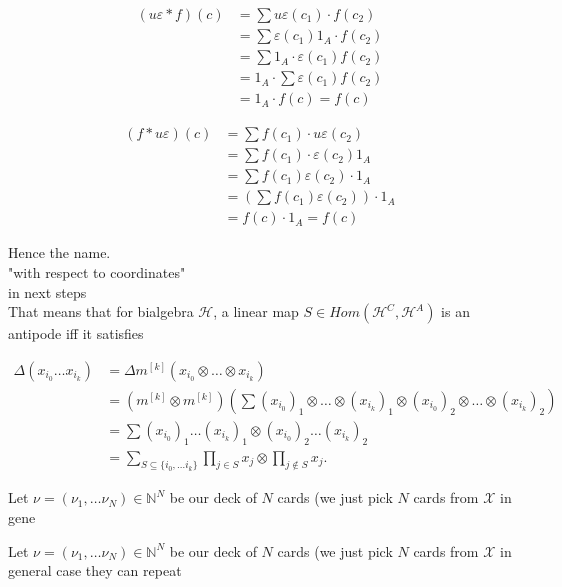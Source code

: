\documentclass[a4paper]{article}
\begin{document}
\begin{align*}
(u\varepsilon *f)(c) &= \sum u\varepsilon(c_1) \cdot f(c_2) \\
&= \sum \varepsilon(c_1)1_A \cdot f(c_2) \\
&= \sum 1_A \cdot \varepsilon(c_1)f(c_2) \\
&= 1_A \cdot \sum \varepsilon(c_1)f(c_2) \\
&= 1_A \cdot f(c) = f(c)
\end{align*}

\begin{align*}
(f * u\varepsilon)(c) &= \sum f(c_1) \cdot u\varepsilon(c_2) \\
&= \sum f(c_1) \cdot \varepsilon(c_2)1_A \\
&= \sum f(c_1)\varepsilon(c_2) \cdot 1_A \\
&= \left(\sum f(c_1)\varepsilon(c_2)\right)\cdot 1_A \\
&= f(c) \cdot 1_A = f(c)
\end{align*}


Hence the name. \\

"with respect to coordinates" \\

in next steps \\

That means that for bialgebra $\mathcal{H}$, a linear map $S \in Hom(\mathcal{H}^C, \mathcal{H}^A)$ 
is an antipode iff it satisfies

\begin{align*}
\Delta(x_{i_0}\dots x_{i_k}) &= \Delta m^{[k]}(x_{i_0} \otimes \dots \otimes x_{i_k}) \\ 
&= (m^{[k]} \otimes m^{[k]}) \left(\sum (x_{i_0})_1 \otimes \dots \otimes (x_{i_k})_1 \otimes 
(x_{i_0})_2 \otimes \dots \otimes (x_{i_k})_2\right) \\ 
&= \sum (x_{i_0})_1 \dots (x_{i_k})_1 \otimes 
(x_{i_0})_2 \dots (x_{i_k})_2 \\ 
&= \sum_{S \subseteq \{i_0, \dots i_k\}} \prod_{j \in S} x_j \otimes \prod_{j \notin S} x_j.
\end{align*}

Let $\nu = (\nu_1, \dots \nu_N) \in \mathbb{N}^N$ be our deck of $N$ cards (we just pick $N$ cards from 
$\mathcal{X}$ in gene

Let $\nu = (\nu_1, \dots \nu_N) \in \mathbb{N}^N$ be our deck of $N$ cards (we just pick $N$ cards from 
$\mathcal{X}$ in general case they can repeat
\end{document}
